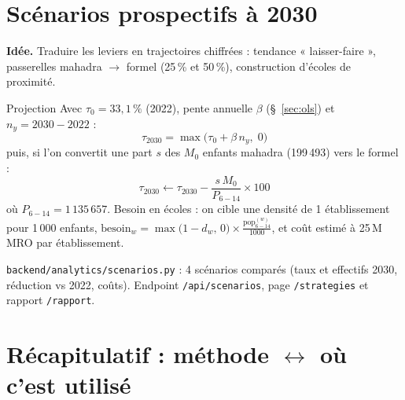 \documentclass[11pt,a4paper]{article}
\newcommand{\txt}[1]{\texttt{#1}}
\begin{document}
\section{Scénarios prospectifs à 2030}
\label{sec:scenarios}

\textbf{Idée.} Traduire les leviers en trajectoires chiffrées : tendance
« laisser-faire », passerelles mahadra $\to$ formel (25\,\% et 50\,\%),
construction d'écoles de proximité.

\begin{meth}{Projection}
Avec $\tau_0=33{,}1\,\%$ (2022), pente annuelle $\beta$ (§~\ref{sec:ols}) et
$n_y = 2030-2022$ :
\[
\tau_{2030} = \max\big(\tau_0 + \beta\,n_y,\;0\big)
\]
puis, si l'on convertit une part $s$ des $M_0$ enfants mahadra (199\,493)
vers le formel :
\[
\tau_{2030} \leftarrow \tau_{2030} - \frac{s\,M_0}{P_{6-14}} \times 100
\]
où $P_{6-14}=1\,135\,657$. Besoin en écoles : on cible une densité de 1
établissement pour 1\,000 enfants,
$\text{besoin}_w = \max\big(1 - d_w,\,0\big)\times \frac{\text{pop}_{6-14}^{(w)}}{1000}$,
et coût estimé à 25\,M\,MRO par établissement.
\end{meth}

\begin{where}
\txt{backend/analytics/scenarios.py} : 4 scénarios comparés (taux et
effectifs 2030, réduction vs 2022, coûts). Endpoint \txt{/api/scenarios},
page \txt{/strategies} et rapport \txt{/rapport}.
\end{where}

\section{Récapitulatif : méthode $\leftrightarrow$ où c'est utilisé}
\label{sec:resume}
\end{document}
